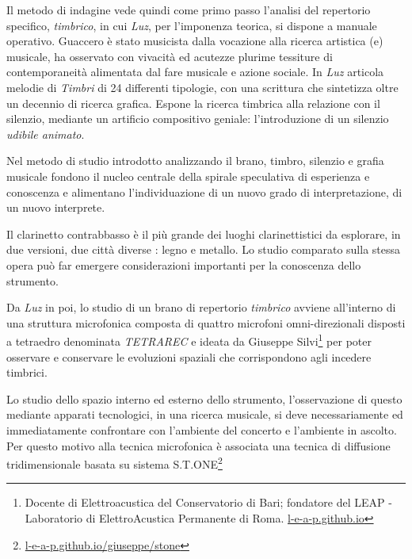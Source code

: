 \documentclass{gs-adonis}
\begin{document}

Il metodo di indagine vede quindi come primo passo l'analisi del repertorio
specifico, \emph{timbrico}, in cui \emph{Luz}, per l'imponenza teorica, si
dispone a manuale operativo. Guaccero è stato musicista dalla vocazione alla
ricerca artistica (e) musicale, ha osservato con vivacità ed acutezze plurime
tessiture di contemporaneità alimentata dal fare musicale e azione sociale.
In \emph{Luz} articola melodie di \emph{Timbri} di 24 differenti tipologie, con
una scrittura che sintetizza oltre un decennio di ricerca grafica. Espone la
ricerca timbrica alla relazione con il silenzio, mediante un artificio
compositivo geniale: l'introduzione di un silenzio \emph{udibile animato}.

Nel metodo di studio introdotto analizzando il brano, timbro, silenzio e grafia
musicale fondono il nucleo centrale della spirale speculativa di esperienza e
conoscenza e alimentano l'individuazione di un nuovo grado di interpretazione,
di un nuovo interprete.

Il clarinetto contrabbasso è il più grande dei luoghi clarinettistici da esplorare,
in due versioni, due città diverse \cite{netti23}: legno e metallo. Lo studio
comparato sulla stessa opera può far emergere considerazioni importanti per la
conoscenza dello strumento.

Da \emph{Luz} in poi, lo studio di un brano di repertorio \emph{timbrico}
avviene all'interno di una struttura microfonica composta di quattro microfoni
omni-direzionali disposti a tetraedro denominata \emph{TETRAREC} e ideata da
Giuseppe Silvi\footnote{%
  Docente di Elettroacustica del Conservatorio di Bari; fondatore del LEAP -
  Laboratorio di ElettroAcustica Permanente di Roma.
  \url{l-e-a-p.github.io}
} per poter osservare e conservare le evoluzioni spaziali che corrispondono agli
incedere timbrici.

Lo studio dello spazio interno ed esterno dello strumento, l'osservazione di
questo mediante apparati tecnologici, in una ricerca musicale, si deve
necessariamente ed immediatamente confrontare con l'ambiente del concerto e
l'ambiente in ascolto. Per questo motivo alla tecnica microfonica è associata
una tecnica di diffusione tridimensionale basata su sistema S.T.ONE\footnote{%
  \url{l-e-a-p.github.io/giuseppe/stone}
}
\end{document}
